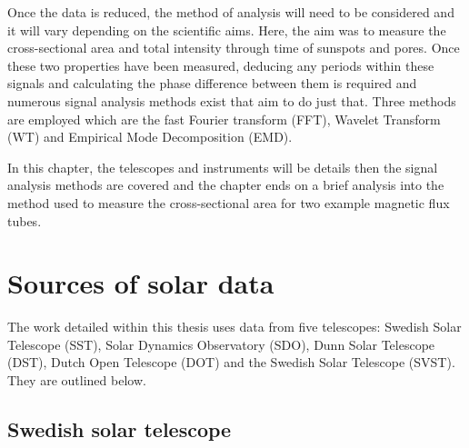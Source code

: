 	Once the data is reduced, the method of analysis will need to be considered and it will vary depending on the scientific aims.
	Here, the aim was to measure the cross-sectional area and total intensity through time of sunspots and pores.
    Once these two properties have been measured, deducing any periods within these signals and calculating the phase difference between them is required and numerous signal analysis methods exist that aim to do just that.
    Three methods are employed which are the fast Fourier transform (FFT), Wavelet Transform (WT) and Empirical Mode Decomposition (EMD).  

    In this chapter, the telescopes and instruments will be details then the signal analysis methods are covered and the chapter ends on a brief analysis into the method used to measure the cross-sectional area for two example magnetic flux tubes.
	
\section{Sources of solar data}

	The work detailed within this thesis uses data from five telescopes: Swedish Solar Telescope (SST), Solar Dynamics Observatory (SDO), Dunn Solar Telescope (DST), Dutch Open Telescope (DOT) and the Swedish Solar Telescope (SVST).
    They are outlined below.
    
\subsection{Swedish solar telescope}

